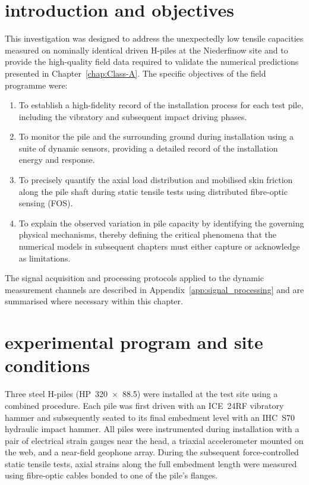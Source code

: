 \section{introduction and objectives}
This investigation was designed to address the unexpectedly low tensile capacities measured on nominally identical driven H-piles at the Niederfinow site and to provide the high-quality field data required to validate the numerical predictions presented in Chapter~\ref{chap:Class-A}. The specific objectives of the field programme were:
\begin{enumerate}
	\item To establish a high-fidelity record of the installation process for each test pile, including the vibratory and subsequent impact driving phases.
	\item To monitor the pile and the surrounding ground during installation using a suite of dynamic sensors, providing a detailed record of the installation energy and response.
	\item To precisely quantify the axial load distribution and mobilised skin friction along the pile shaft during static tensile tests using distributed fibre-optic sensing (FOS).
	\item To explain the observed variation in pile capacity by identifying the governing physical mechanisms, thereby defining the critical phenomena that the numerical models in subsequent chapters must either capture or acknowledge as limitations.
\end{enumerate}
The signal acquisition and processing protocols applied to the dynamic measurement channels are described in Appendix~\ref{app:signal_processing} and are summarised where necessary within this chapter.

\section{experimental program and site conditions}
Three steel H-piles (HP~320~$\times$~88.5) were installed at the test site using a combined procedure. Each pile was first driven with an ICE~24RF vibratory hammer and subsequently seated to its final embedment level with an IHC~S70 hydraulic impact hammer. All piles were instrumented during installation with a pair of electrical strain gauges near the head, a triaxial accelerometer mounted on the web, and a near-field geophone array. During the subsequent force-controlled static tensile tests, axial strains along the full embedment length were measured using fibre-optic cables bonded to one of the pile's flanges.


